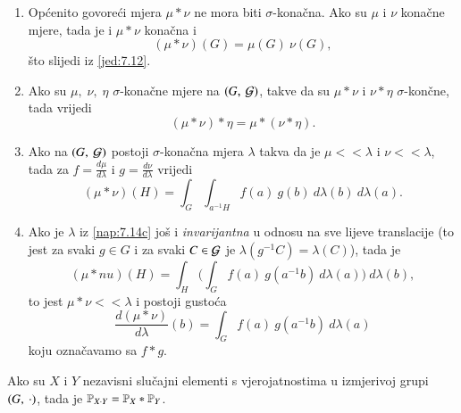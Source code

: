 \begin{nap} \label{nap:7.14}
    \begin{enumerate}[label=(\alph*)]
        \item Op\' cenito govore\' ci mjera $\mu * \nu$ ne mora biti $\sigma$-kona\v cna.
        Ako su $\mu$ i $\nu$ kona\v cne mjere, tada je i $\mu * \nu$ kona\v cna i
        \begin{equation*}
            (\mu * \nu) (G) = \mu (G) \: \nu (G),
        \end{equation*}
        \v sto slijedi iz \eqref{jed:7.12}.
        \item Ako su $\mu, \; \nu, \; \eta$ $\sigma$-kona\v cne mjere na $({G}, \: {\mathcal{G}})$, takve da su $\mu * \nu$ i $\nu * \eta$ $\sigma$-kon\v cne, tada vrijedi
        \begin{equation*}
            (\mu * \nu) * \eta = \mu * (\nu * \eta).
        \end{equation*}
        \item   \label{nap:7.14c}
        Ako na $({G}, \: {\mathcal{G}})$ postoji $\sigma$-kona\v cna mjera $\lambda$ takva da je $\mu << \lambda$ i $\nu << \lambda$, tada za $f = \frac{d \mu}{d \lambda}$ i $g = \frac{d \nu}{d \lambda}$ vrijedi
        \begin{equation*}
            (\mu * \nu) (H) = \int_G \int_{a^{-1} H} f(a) \: g(b) \: d \lambda (b) \: d \lambda (a).
        \end{equation*}
        \item Ako je $\lambda$ iz \ref{nap:7.14c} jo\v s i \emph{invarijantna} u odnosu na sve lijeve translacije (to jest za svaki $g \in G$ i za svaki $C \in \mathcal{G}$ je $\lambda (g^{-1} C) = \lambda (C)$), tada je
        \begin{equation*}
            (\mu * nu) (H) = \int_H \Big( \int_G f(a) \: g (a^{-1} b) \: d \lambda (a) \Big) \: d \lambda (b),
        \end{equation*}
        to jest $\mu * \nu << \lambda$ i postoji gusto\' ca
        \begin{equation*}
            \frac{d (\mu * \nu)}{d \lambda} (b) = \int_G f(a) \: g (a^{-1} b) \: d \lambda (a)
        \end{equation*}
        koju ozna\v cavamo sa \emph{$f*g$}.
    \end{enumerate}
\end{nap}

\begin{tm}  \label{tm:7.15}
    Ako su $X$ i $Y$ nezavisni slu\v cajni elementi s vjerojatnostima u izmjerivoj grupi $({G}, \: {\cdot})$, tada je $\mathbb{P}_{X \cdot Y} = \mathbb{P}_X * \mathbb{P}_Y$.
\end{tm}

